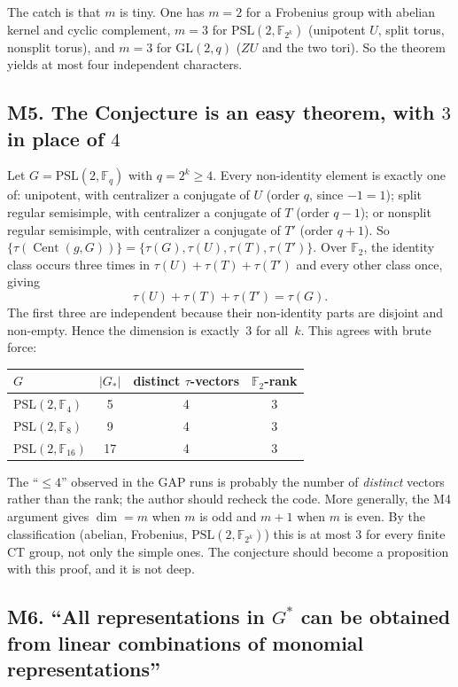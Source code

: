 \documentclass[12pt,letterpaper]{article}
\newcommand{\F}{\mathbb{F}}
\newcommand{\Cent}{\operatorname{Cent}}
\newcommand{\PSL}{\mathrm{PSL}}
\newcommand{\GL}{\mathrm{GL}}
\theoremstyle{definition}
\begin{document}
The catch is that $m$ is tiny. One has $m=2$ for a Frobenius group with
abelian kernel and cyclic complement, $m=3$ for $\PSL(2,\F_{2^k})$
(unipotent $U$, split torus, nonsplit torus), and $m=3$ for $\GL(2,q)$
($ZU$ and the two tori). So the theorem yields at most four independent
characters.

\subsection*{M5. The Conjecture is an easy theorem, with $3$ in place of $4$}

Let $G=\PSL(2,\F_q)$ with $q=2^k\ge4$. Every non-identity element is
exactly one of: unipotent, with centralizer a conjugate of $U$ (order
$q$, since $-1=1$); split regular semisimple, with centralizer a
conjugate of $T$ (order $q-1$); or nonsplit regular semisimple, with
centralizer a conjugate of $T'$ (order $q+1$). So
$\{\tau(\Cent(g,G))\}=\{\tau(G),\tau(U),\tau(T),\tau(T')\}$. Over
$\F_2$, the identity class occurs three times in
$\tau(U)+\tau(T)+\tau(T')$ and every other class once, giving
\[
\tau(U)+\tau(T)+\tau(T')=\tau(G).
\]
The first three are independent because their non-identity parts are
disjoint and non-empty. Hence the dimension is exactly~$3$ for all~$k$.
This agrees with brute force:

\begin{center}
\begin{tabular}{lccc}
\toprule
$G$ & $|G_*|$ & distinct $\tau$-vectors & $\F_2$-rank\\
\midrule
$\PSL(2,\F_4)$ & 5 & 4 & 3\\
$\PSL(2,\F_8)$ & 9 & 4 & 3\\
$\PSL(2,\F_{16})$ & 17 & 4 & 3\\
\bottomrule
\end{tabular}
\end{center}

The ``$\le4$'' observed in the GAP runs is probably the number of
\emph{distinct} vectors rather than the rank; the author should recheck
the code. More generally, the M4 argument gives $\dim=m$ when $m$ is odd
and $m+1$ when $m$ is even. By the classification (abelian, Frobenius,
$\PSL(2,\F_{2^k})$) this is at most $3$ for every finite CT group, not
only the simple ones. The conjecture should become a proposition with
this proof, and it is not deep.

\subsection*{M6. ``All representations in $G^*$ can be obtained from linear combinations of monomial representations''}
\end{document}
